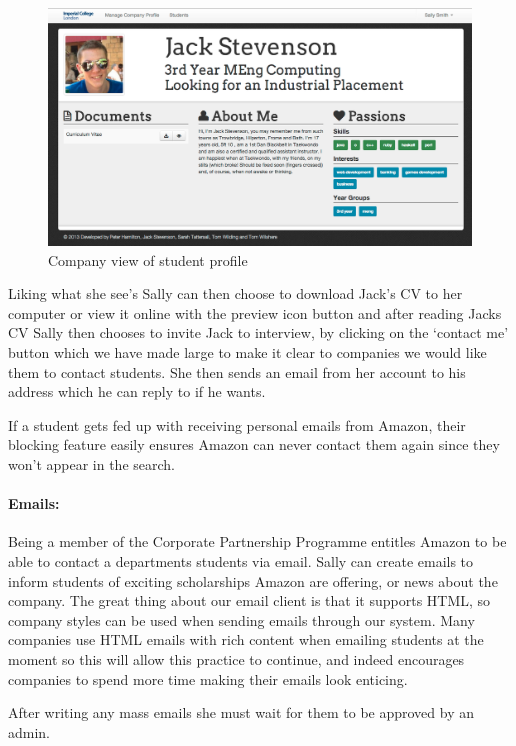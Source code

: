     \begin{figure}[H]\centering
    \includegraphics[scale=0.3]{images/user_experiences/company/jack_profile}
    \caption{Company view of student profile}
    \end{figure}

    Liking what she see's Sally can then choose to download Jack's CV to her computer or view it online with the preview icon button and after reading Jacks CV Sally then chooses to invite Jack to interview, by clicking on the `contact me' button which we have made large to make it clear to companies we would like them to contact students. She then sends an email from her account to his address which he can reply to if he wants. 

    If a student gets fed up with receiving personal emails from Amazon, their blocking feature easily ensures Amazon can never contact them again since they won't appear in the search.

  \paragraph{Emails:}
    Being a member of the Corporate Partnership Programme entitles Amazon to be able to contact a departments students via email. Sally can create emails to inform students of exciting scholarships Amazon are offering, or news about the company. The great thing about our email client is that it supports HTML, so company styles can be used when sending emails through our system. Many companies use HTML emails with rich content when emailing students at the moment so this will allow this practice to continue, and indeed encourages companies to spend more time making their emails look enticing.

    After writing any mass emails she must wait for them to be approved by an admin. 

